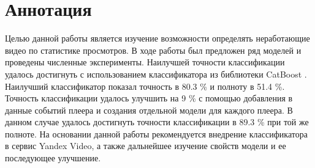 
\chapter*{Аннотация}

Целью данной работы является изучение возможности определять неработающие видео по статистике просмотров. В ходе работы был предложен ряд моделей и проведены численные эксперименты. Наилучшей точности классификации удалось достигнуть с использованием классификатора из библиотеки CatBoost \cite{Prokhorenkova2017}. Наилучший классификатор показал точность в 80.3 \% и полноту в 51.4 \%. Точность классификации удалось улучшить на 9 \% с помощью добавления в данные событий плеера и создания отдельной модели для каждого плеера. В данном случае удалось достигнуть точности классификации в 89.3 \% при той же полноте. На основании данной работы рекомендуется внедрение классификатора в сервис Yandex Video, а также дальнейшее изучение свойств модели и ее последующее улучшение.